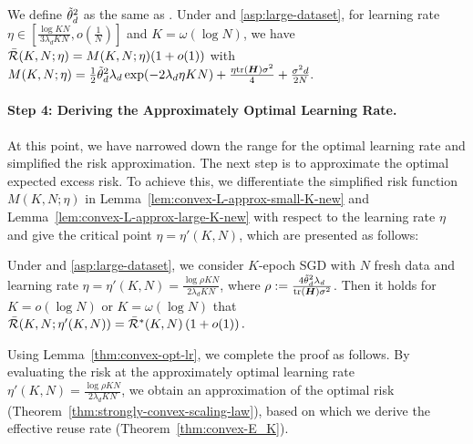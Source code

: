 \begin{lemma}[Large $K$]
    \label{lem:convex-L-approx-large-K-new}
    We define $\Tilde{\theta}_{d}^2$ as the same as . Under  and \ref{asp:large-dataset}, for learning rate $\eta \in [\frac{\log KN}{3\lambda_d KN}, o\left(\frac{1}{N}\right)]$ and $K = \omega(\log N)$, we have $\Bar{\mathcal{R}}(K, N;\eta) = M(K, N;\eta)(1+ o(1))$ with $M(K, N;\eta) = \frac{1}{2}\Tilde{\theta}_d^2 \lambda_d \exp(-2\lambda_d \eta KN) + \frac{\eta\mathrm{tr}({\bm{H}})\sigma^2}{4}+\frac{\sigma^2d}{2N}.$
\end{lemma}

\paragraph{Step 4: Deriving the Approximately Optimal Learning Rate.}
At this point, we have narrowed down the range for the optimal learning rate and simplified the risk approximation. The next step is to approximate the optimal expected excess risk. To achieve this, we differentiate the simplified risk function $M(K, N;\eta)$ in Lemma~\ref{lem:convex-L-approx-small-K-new} and Lemma~\ref{lem:convex-L-approx-large-K-new} with respect to the learning rate $\eta$ and give the critical point $\eta=\eta'(K,N)$, which are presented as follows:
\begin{lemma}
\label{thm:convex-opt-lr}
    Under  and \ref{asp:large-dataset}, we consider $K$-epoch SGD with $N$ fresh data and learning rate $\eta = \eta'(K,N) = \frac{\log \rho KN}{2 \lambda_d KN}$, where $\rho := \frac{4\Tilde{\theta}_d^2\lambda_d}{\mathrm{tr}({\bm{H}})\sigma^2}$. Then it holds for $K =o(\log N)$ or $K =\omega(\log N)$ that $\Bar{\mathcal{R}}(K,N;\eta'(K,N)) = \Bar{\mathcal{R}}^*(K,N)\left(1 + o(1)\right).$
\end{lemma}
Using Lemma~\ref{thm:convex-opt-lr}, we complete the proof as follows. By evaluating the risk at the approximately optimal learning rate $\eta'(K,N) = \frac{\log \rho KN}{2 \lambda_d KN}$, we obtain an approximation of the optimal risk (Theorem~\ref{thm:strongly-convex-scaling-law}), based on which we derive the effective reuse rate (Theorem~\ref{thm:convex-E_K}).

